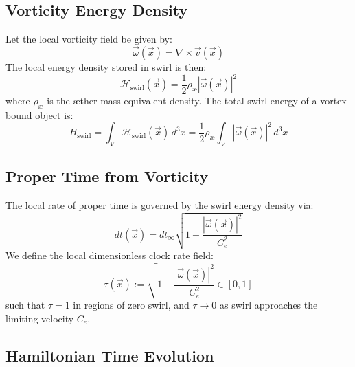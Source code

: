 \documentclass[12pt]{article}
\begin{document}
    \subsection{Vorticity Energy Density}

    Let the local vorticity field be given by:
    \begin{equation}
        \vec{\omega}(\vec{x}) = \nabla \times \vec{v}(\vec{x})
    \end{equation}
    The local energy density stored in swirl is then:
    \begin{equation}
        \mathcal{H}_{\text{swirl}}(\vec{x}) = \frac{1}{2} \rho_\text{\ae} |\vec{\omega}(\vec{x})|^2
    \end{equation}
    where \( \rho_\text{\ae} \) is the æther mass-equivalent density. The total swirl energy of a vortex-bound object is:
    \begin{equation}
        H_{\text{swirl}} = \int_V \mathcal{H}_{\text{swirl}}(\vec{x}) \, d^3x = \frac{1}{2} \rho_\text{\ae} \int_V |\vec{\omega}(\vec{x})|^2 \, d^3x
    \end{equation}

    \subsection{Proper Time from Vorticity}

    The local rate of proper time is governed by the swirl energy density via:
    \begin{equation}
        dt(\vec{x}) = dt_\infty \sqrt{1 - \frac{|\vec{\omega}(\vec{x})|^2}{C_e^2}}
    \end{equation}
    We define the local dimensionless clock rate field:
    \begin{equation}
        \tau(\vec{x}) := \sqrt{1 - \frac{|\vec{\omega}(\vec{x})|^2}{C_e^2}} \in [0,1]
    \end{equation}
    such that \( \tau = 1 \) in regions of zero swirl, and \( \tau \to 0 \) as swirl approaches the limiting velocity \( C_e \).

    \subsection{Hamiltonian Time Evolution}
\end{document}
